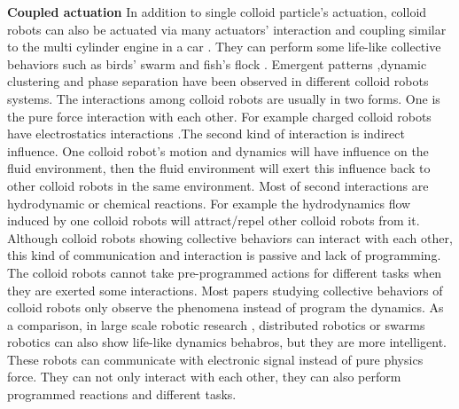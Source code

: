 \textbf{Coupled actuation}  In addition to single colloid particle's actuation,  colloid robots can also be actuated via many actuators' interaction and coupling similar to the multi cylinder engine in a car . They can perform some life-like collective behaviors such as  birds' swarm and fish's flock \cite{wang2015one,ginot2018aggregation}. Emergent patterns ,dynamic clustering and phase separation have been observed  in different colloid robots systems. \cite{buttinoni2013dynamical,ginot2018aggregation,duan2013transition,theurkauff2012dynamic} The interactions among colloid robots are usually in two forms. One is the pure force interaction with each other. For example charged colloid robots have electrostatics interactions \cite{dou2018emergence}.The second kind of interaction is indirect influence. One colloid robot's motion and dynamics  will have influence on the fluid environment, then  the fluid environment will exert this influence back to other colloid robots in the same environment. Most of second interactions are hydrodynamic or chemical reactions. For example the hydrodynamics flow induced by one colloid robots will attract/repel other colloid robots from it. \cite{karani2019tuning} Although colloid robots showing collective behaviors can interact with each other, this kind of communication and interaction is passive and lack of programming. The colloid robots cannot take pre-programmed actions for different tasks when they are exerted some interactions. Most papers studying collective behaviors of colloid robots only observe the phenomena instead of  program the dynamics.  As a comparison, in large scale robotic research , distributed robotics or  swarms robotics\cite{wei2010sambot,arvin2014colias} can also show life-like dynamics behabros, but they are more intelligent. These robots can communicate with electronic signal instead of pure physics force. They can not only interact with each other, they can also perform programmed reactions and different tasks.\cite{rubenstein2012kilobot,rubenstein2014programmable,li2019particle}

